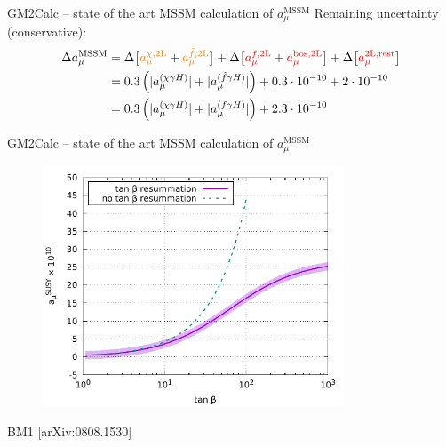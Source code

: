 \documentclass[hyperref={pdfpagelabels=false},ngerman]{beamer}
\newcommand{\MSSM}{\ensuremath{\text{MSSM}}}
\newcommand{\amu}{a_\mu}
\newcommand{\amuMSSM}{\amu^{\MSSM}}
\newcommand{\amuMSSMTwoLBZC}{\amu^{\chi,\text{2L}}}
\newcommand{\amuMSSMTwoLBZf}{\amu^{\tilde{f},\text{2L}}}
\newcommand{\amuMSSMTwoLHf}{\amu^{f,\text{2L}}}
\newcommand{\amuMSSMTwoLHV}{\amu^{\text{bos},\text{2L}}}
\newcommand{\amuMSSMTwoLrest}{\amu^{\text{2L,rest}}}
\begin{document}
\begin{frame}{GM2Calc -- state of the art MSSM calculation of $\amuMSSM$}
  Remaining uncertainty (conservative):
  \begin{align*}
    \Delta \amuMSSM &=
    \Delta\big[\textcolor{orange}{\amuMSSMTwoLBZC} + \textcolor{orange}{\amuMSSMTwoLBZf}\big]
    +\Delta\big[\textcolor{red}{\amuMSSMTwoLHf} + \textcolor{red}{\amuMSSMTwoLHV}\big]
    +\Delta\big[\textcolor{red}{\amuMSSMTwoLrest}\big]\\
    &= 0.3 \left( |a_\mu^{(\chi\gamma H)}| + |a_\mu^{(\tilde{f}\gamma H)}| \right)
    + 0.3 \cdot 10^{-10} + 2 \cdot 10^{-10}\\
    &= 0.3 \left( |a_\mu^{(\chi\gamma H)}| + |a_\mu^{(\tilde{f}\gamma H)}| \right)
    + 2.3\cdot 10^{-10}
  \end{align*}
\end{frame}

\begin{frame}{GM2Calc -- state of the art MSSM calculation of $\amuMSSM$}
  \begin{figure}
    \centering
    \includegraphics[width=0.8\textwidth]{plots/tb_resummation_uncertainty}
  \end{figure}
  BM1 [arXiv:0808.1530]
\end{frame}
\end{document}
